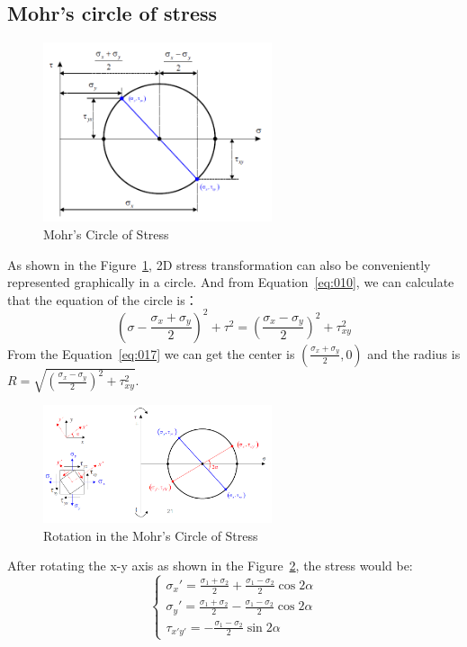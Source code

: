 \documentclass[en,hazy,cyan,8pt,normal]{elegantnote}
\begin{document}
  \subsection{Mohr's circle of stress}
    \begin{figure}[H]
      \centering
      \includegraphics[width=0.6\textwidth]{image/007.png}
      \caption{Mohr's Circle of Stress}
      \label{fig:007}
    \end{figure}
    As shown in the Figure~\ref{fig:007}, 2D stress transformation can also be conveniently represented graphically in a circle. And from Equation~\ref{eq:010}, we can calculate that the equation of the circle is：
    \begin{equation}\label{eq:017}
      \left( \sigma - \frac{\sigma_x + \sigma_y}{2} \right)^2 + \tau^2 = \left( \frac{\sigma_x - \sigma_y}{2} \right)^2 + \tau_{xy}^2
    \end{equation}
    From the Equation~\ref{eq:017} we can get the center is $\displaystyle \left(\frac{\sigma_x + \sigma_y}{2}, 0\right)$ and the radius is $\displaystyle R=\sqrt{\left( \frac{\sigma_x - \sigma_y}{2} \right)^2 + \tau_{xy}^2}$.
    \begin{figure}[H]
      \centering
      \includegraphics[width=0.6\textwidth]{image/008.png}
      \caption{Rotation in the Mohr's Circle of Stress}
      \label{fig:008}
    \end{figure}
    After rotating the x-y axis as shown in the Figure~\ref{fig:008}, the stress would be:
    \begin{equation}\label{eq:018}
      \begin{cases}
        \displaystyle \sigma_x'=\frac{\sigma_1+\sigma_2}{2}+\frac{\sigma_1-\sigma_2}{2}\cos2\alpha\\
        \displaystyle \sigma_y'=\frac{\sigma_1+\sigma_2}{2}-\frac{\sigma_1-\sigma_2}{2}\cos2\alpha\\
        \displaystyle \tau_{x'y'}=-\frac{\sigma_1-\sigma_2}{2}\sin2\alpha
      \end{cases}
    \end{equation}
  
\end{document}
